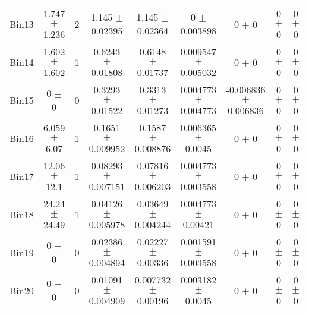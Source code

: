 \begin{tabular}{@{\extracolsep{4pt}}lcccccccc@{}}
     Bin13 & 1.747 $\pm$ 1.236 & 2 & 1.145 $\pm$ 0.02395 & 1.145 $\pm$ 0.02364 & 0 $\pm$ 0.003898 & 0 $\pm$ 0 & 0 $\pm$ 0 & 0 $\pm$ 0 \\ 
     Bin14 & 1.602 $\pm$ 1.602 & 1 & 0.6243 $\pm$ 0.01808 & 0.6148 $\pm$ 0.01737 & 0.009547 $\pm$ 0.005032 & 0 $\pm$ 0 & 0 $\pm$ 0 & 0 $\pm$ 0 \\ 
     Bin15 & 0 $\pm$ 0 & 0 & 0.3293 $\pm$ 0.01522 & 0.3313 $\pm$ 0.01273 & 0.004773 $\pm$ 0.004773 & -0.006836 $\pm$ 0.006836 & 0 $\pm$ 0 & 0 $\pm$ 0 \\ 
     Bin16 & 6.059 $\pm$ 6.07 & 1 & 0.1651 $\pm$ 0.009952 & 0.1587 $\pm$ 0.008876 & 0.006365 $\pm$ 0.0045 & 0 $\pm$ 0 & 0 $\pm$ 0 & 0 $\pm$ 0 \\ 
     Bin17 & 12.06 $\pm$ 12.1 & 1 & 0.08293 $\pm$ 0.007151 & 0.07816 $\pm$ 0.006203 & 0.004773 $\pm$ 0.003558 & 0 $\pm$ 0 & 0 $\pm$ 0 & 0 $\pm$ 0 \\ 
     Bin18 & 24.24 $\pm$ 24.49 & 1 & 0.04126 $\pm$ 0.005978 & 0.03649 $\pm$ 0.004244 & 0.004773 $\pm$ 0.00421 & 0 $\pm$ 0 & 0 $\pm$ 0 & 0 $\pm$ 0 \\ 
     Bin19 & 0 $\pm$ 0 & 0 & 0.02386 $\pm$ 0.004894 & 0.02227 $\pm$ 0.00336 & 0.001591 $\pm$ 0.003558 & 0 $\pm$ 0 & 0 $\pm$ 0 & 0 $\pm$ 0 \\ 
     Bin20 & 0 $\pm$ 0 & 0 & 0.01091 $\pm$ 0.004909 & 0.007732 $\pm$ 0.00196 & 0.003182 $\pm$ 0.0045 & 0 $\pm$ 0 & 0 $\pm$ 0 & 0 $\pm$ 0 \\ 
\hline\hline
  \end{tabular}
